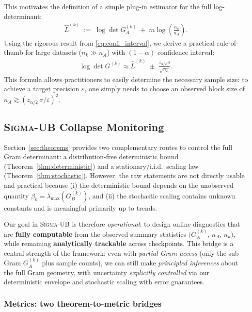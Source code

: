 \documentclass{article}
\theoremstyle{plain}
\theoremstyle{definition}
\theoremstyle{remark}
\newcommand{\sgma}{\textsc{Sigma}\xspace}
\begin{document}
This motivates the definition of a simple plug-in estimator for the full log-determinant:
\begin{align}
\widehat{L}^{(k)}
\;:=\;
\log\det G_A^{(k)} \;+\; m\log\left(\frac{n_k}{n_A}\right).
\end{align}
Using the rigorous result from \eqref{eq:confi_interval}, we derive a practical rule-of-thumb for large datasets ($n_k \gg n_A$) with $(1-\alpha)$ confidence interval:
\begin{align}
\log\det G^{(k)}
\approx
\widehat{L}^{(k)} \;\pm\; \frac{z_{\alpha/2}\,\sigma}{\sqrt{n_A}}.
\end{align}
This formula allows practitioners to easily determine the necessary sample size: to achieve a target precision $\varepsilon$, one simply needs to choose an observed block size of $n_A \gtrsim (z_{\alpha/2}\,\sigma / \varepsilon)^2$.




\subsection{\sgma-UB Collapse Monitoring}
\label{subsec:method4:ubmetrics}

Section~\ref{sec:theorems} provides two complementary routes to control the full Gram determinant:
a distribution-free deterministic bound (Theorem~\ref{thm:deterministic}) and a stationary/i.i.d.\ scaling law
(Theorem~\ref{thm:stochastic}). However, the raw statements are not directly usable and practical because (i) the
deterministic bound depends on the unobserved quantity $\beta_k=\lambda_{\max}(G_B^{(k)})$, and
(ii) the stochastic scaling contains unknown constants and is meaningful primarily up to trends.

Our goal in \sgma-UB is therefore \emph{operational}: to design online diagnostics that are
\textbf{fully computable} from the observed summary statistics $\big(G_A^{(k)},\, n_A,\, n_k\big)$,
while remaining \textbf{analytically trackable} across checkpoints. This bridge is a central strength
of the framework: even with \emph{partial Gram access} (only the sub-Gram $G_A^{(k)}$ plus sample counts),
we can still make \emph{principled inferences} about the full Gram geometry, with uncertainty
\emph{explicitly controlled} via our deterministic envelope and stochastic scaling with error guarantees.


\subsubsection{Metrics: two theorem-to-metric bridges}
\label{subsec:method4:metric_design}
\end{document}
